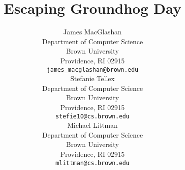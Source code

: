 \documentclass[11pt]{article} %
\title{Escaping Groundhog Day}
\author{
James MacGlashan \\
Department of Computer Science\\
Brown University\\
Providence, RI 02915 \\
\texttt{james\_macglashan@brown.edu} \\
\And
Stefanie Tellex \\
Department of Computer Science\\
Brown University\\
Providence, RI 02915 \\
\texttt{stefie10@cs.brown.edu} \\
\AND
Michael Littman \\
Department of Computer Science\\
Brown University\\
Providence, RI 02915 \\
\texttt{mlittman@cs.brown.edu}
}
\begin{document}
\maketitle

\begin{abstract}






\end{abstract}
\end{document}

